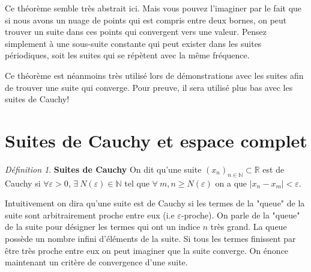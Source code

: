 \documentclass[oneside,12pt,french,table]{book}
\theoremstyle{definition}
\theoremstyle{plain}
\theoremstyle{remark}
\newtheorem{defi}[definition]{Définition}
\newcommand{\Nn}{{\mathbb{N}}}
\newcommand{\Rr}{{\mathbb{R}}}
\begin{document}

 

Ce théorème semble très abstrait ici. Mais vous pouvez l'imaginer par le fait que si nous avons un nuage de points qui est compris entre deux bornes, on peut trouver un suite dans ces points qui convergent vers une valeur. Pensez simplement à une sous-suite constante qui peut exister dans les suites périodiques, soit les suites qui se répètent avec la même fréquence.

Ce théorème est néanmoins très utilisé lors de démonstrations avec les suites afin de trouver une suite qui converge. Pour preuve, il sera utilisé plus bas avec les suites de Cauchy!

\section{Suites de Cauchy et espace complet}
\begin{defi}{\textbf{Suites de Cauchy}} 
   On dit qu'une suite $(x_n)_{n \in \Nn} \subset \Rr $ est de Cauchy si $\forall \varepsilon >0 $, $\exists \: N(\varepsilon) \in \Nn $ tel que $\forall \: m,n \ge N(\varepsilon)$ on a que $|x_n - x_m| < \varepsilon$.  
\end{defi}
Intuitivement on dira qu'une suite est de Cauchy si les termes de la "queue" de la suite sont arbitrairement proche entre eux (i.e $\varepsilon$-proche).  On parle de la "queue" de la suite pour désigner les termes qui ont un indice $n$ très grand. La queue possède un nombre infini d'éléments de la suite.  Si tous les termes finissent par être très proche entre eux on peut imaginer que la suite converge. On énonce maintenant un critère de convergence d'une suite. 
\end{document}
